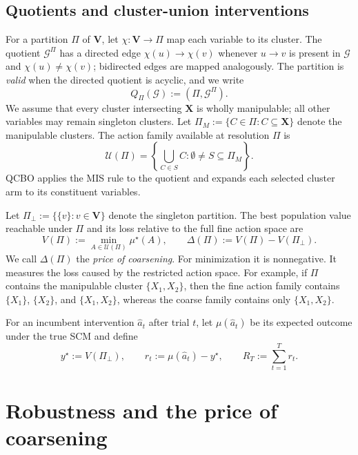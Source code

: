 \documentclass[twoside]{article}
\newcommand{\Gg}{\mathcal{G}}
\begin{document}
\subsection{Quotients and cluster-union interventions}

For a partition $\Pi$ of $\mathbf V$, let $\chi:\mathbf V\to\Pi$ map each
variable to its cluster. The quotient $\Gg^\Pi$ has a directed edge
$\chi(u)\to\chi(v)$ whenever $u\to v$ is present in $\Gg$ and
$\chi(u)\ne\chi(v)$; bidirected edges are mapped analogously. The partition
is \emph{valid} when the directed quotient is acyclic, and we write
\begin{equation}
  Q_\Pi(\Gg):=(\Pi,\Gg^\Pi).
  \label{eq:quotient}
\end{equation}
We assume that every cluster intersecting $\mathbf X$ is wholly manipulable;
all other variables may remain singleton clusters. Let
$\Pi_M:=\{C\in\Pi:C\subseteq\mathbf X\}$ denote the manipulable clusters.
The action family available at resolution $\Pi$ is
\begin{equation}
  \mathcal U(\Pi)=
  \left\{\bigcup_{C\in S}C:\emptyset\ne S\subseteq\Pi_M\right\}.
  \label{eq:cluster-actions}
\end{equation}
QCBO applies the MIS rule to the quotient and expands each selected cluster
arm to its constituent variables.

Let $\Pi_\bot:=\{\{v\}:v\in\mathbf V\}$ denote the singleton partition.
The best population value reachable under $\Pi$ and its loss relative to
the full fine action space are
\begin{equation}
  V(\Pi):=\min_{A\in\mathcal U(\Pi)}\mu^\star(A),
  \qquad
  \Delta(\Pi):=V(\Pi)-V(\Pi_\bot).
  \label{eq:price}
\end{equation}
We call $\Delta(\Pi)$ the \emph{price of coarsening}. For minimization it is
nonnegative. It measures the loss caused by the restricted action space. For
example, if $\Pi$ contains the manipulable cluster $\{X_1,X_2\}$, then the
fine action family contains $\{X_1\}$, $\{X_2\}$, and
$\{X_1,X_2\}$, whereas the coarse family contains only
$\{X_1,X_2\}$.

For an incumbent intervention $\hat a_t$ after trial $t$, let
$\mu(\hat a_t)$ be its expected outcome under the true SCM and define
\begin{equation}
  y^\star:=V(\Pi_\bot),\qquad
  r_t:=\mu(\hat a_t)-y^\star,\qquad
  R_T:=\sum_{t=1}^{T}r_t.
  \label{eq:regret}
\end{equation}

\section{Robustness and the price of coarsening}
\label{sec:theory}
\end{document}
